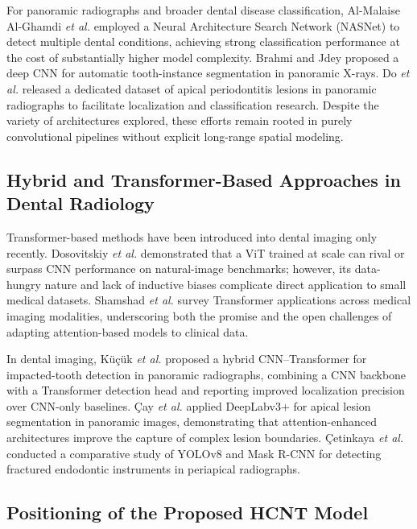 \documentclass[conference]{IEEEtran}
\newcommand{\HCNT}{\textsc{HCNT}\xspace}
\newcommand{\etal}{\textit{et al.}\xspace}
\begin{document}
For panoramic radiographs and broader dental disease classification,
Al-Malaise Al-Ghamdi \etal \cite{alghamdi2022} employed a Neural Architecture
Search Network (NASNet) to detect multiple dental conditions, achieving strong
classification performance at the cost of substantially higher model
complexity. Brahmi and Jdey \cite{brahmi2024} proposed a deep CNN for
automatic tooth-instance segmentation in panoramic X-rays. Do \etal
\cite{do2024} released a dedicated dataset of apical periodontitis lesions in
panoramic radiographs to facilitate localization and classification research.
Despite the variety of architectures explored, these efforts remain rooted in
purely convolutional pipelines without explicit long-range spatial modeling.

\subsection{Hybrid and Transformer-Based Approaches in Dental Radiology}

Transformer-based methods have been introduced into dental imaging only
recently. Dosovitskiy \etal \cite{dosovitskiy2021} demonstrated that a ViT
trained at scale can rival or surpass CNN performance on natural-image
benchmarks; however, its data-hungry nature and lack of inductive biases
complicate direct application to small medical datasets. Shamshad \etal
\cite{shamshad2023} survey Transformer applications across medical imaging
modalities, underscoring both the promise and the open challenges of adapting
attention-based models to clinical data.

In dental imaging, K\"{u}\c{c}\"{u}k \etal \cite{kucuketal2025} proposed a
hybrid CNN--Transformer for impacted-tooth detection in panoramic radiographs,
combining a CNN backbone with a Transformer detection head and reporting
improved localization precision over CNN-only baselines. \c{C}ay \etal
\cite{cay2025} applied DeepLabv3$+$ for apical lesion segmentation in panoramic
images, demonstrating that attention-enhanced architectures improve the capture
of complex lesion boundaries. \c{C}etinkaya \etal \cite{cetinkaya2025}
conducted a comparative study of YOLOv8 and Mask R-CNN for detecting fractured
endodontic instruments in periapical radiographs.

\subsection{Positioning of the Proposed \HCNT Model}
\end{document}
